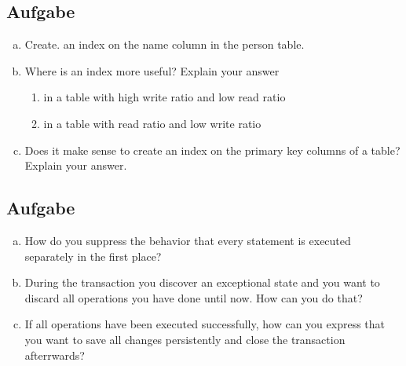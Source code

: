 \documentclass[11pt,a4paper,DIV=9]{scrartcl}
\newcounter{temp}
\newcommand{\aufgabe}[1]{
  \setcounter{temp}{\value{subsection}}
  \setcounter{subsection}{#1}
  \addtocounter{subsection}{-1}
  \subsection{Aufgabe}
  \setcounter{subsection}{\value{temp}}
}
\begin{document}
  \aufgabe{3}
    \begin{enumerate}[a.]
    \item Create. an index on the name column in the person table.
    \item Where is an index more useful? Explain your answer
    \begin{enumerate}[1.]
    \item in a table with high write ratio and low read ratio
    \item in a table with read ratio and low write ratio
    \end{enumerate}
    \item Does it make sense to create an index on the primary key columns of a table? Explain your answer.
    \end{enumerate}
    \aufgabe{4}
      \begin{enumerate}[a.]
      \item How do you suppress the behavior that every statement is executed separately in the first place?
      \item During the transaction you discover an exceptional state and you want to discard all operations you have done until now. How can you do that?
      \item If all operations have been executed successfully, how can you express that you want to save all changes persistently and close the transaction afterrwards? 
      \end{enumerate}
\end{document}
